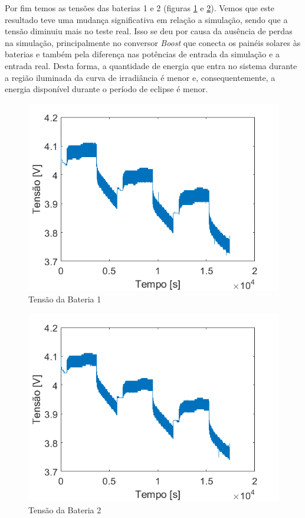Por fim temos as tensões das baterias 1 e 2 (figuras \ref{figura_teste_tensao_bat1} e \ref{figura_teste_tensao_bat2}). Vemos que este resultado teve uma mudança significativa em relação a simulação, sendo que a tensão diminuiu mais no teste real. Isso se deu por causa da ausência de perdas na simulação, principalmente no conversor \textit{Boost} que conecta os painéis solares às baterias e também pela diferença nas potências de entrada da simulação e a entrada real. Desta forma, a quantidade de energia que entra no sistema durante a região iluminada da curva de irradiância é menor e, consequentemente, a energia disponível durante o período de eclipse é menor.

\begin{figure}[!htpb]
\begin{center}
\includegraphics[scale=0.5]{figures/testBat1Voltage.png}
\caption{Tensão da Bateria 1}
\label{figura_teste_tensao_bat1}
\end{center}
\end{figure}

\begin{figure}[!htpb]
\begin{center}
\includegraphics[scale=0.5]{figures/testBat2Voltage.png}
\caption{Tensão da Bateria 2}
\label{figura_teste_tensao_bat2}
\end{center}
\end{figure}

